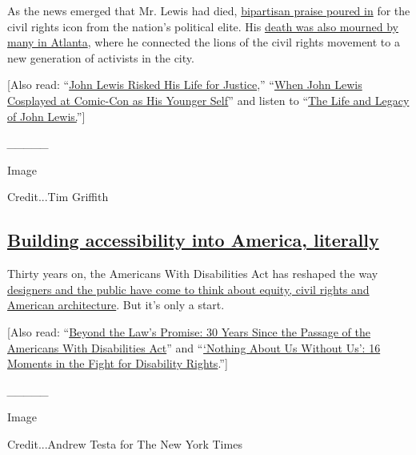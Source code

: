 As the news emerged that Mr. Lewis had died,
\href{https://www.nytimes3xbfgragh.onion/2020/07/18/us/politics/john-lewis-dies-reaction.html}{bipartisan
praise poured in} for the civil rights icon from the nation's political
elite. His
\href{https://www.nytimes3xbfgragh.onion/2020/07/18/us/John-Lewis-Atlanta.html}{death
was also mourned by many in Atlanta}, where he connected the lions of
the civil rights movement to a new generation of activists in the city.

{[}Also read:
``\href{https://www.nytimes3xbfgragh.onion/2020/07/17/opinion/john-lewis.html}{John
Lewis Risked His Life for Justice},''
``\href{https://www.nytimes3xbfgragh.onion/2020/07/21/us/politics/john-lewis-comic-con.html}{When
John Lewis Cosplayed at Comic-Con as His Younger Self}'' and listen to
``\href{https://www.nytimes3xbfgragh.onion/2020/07/20/podcasts/the-daily/john-lewis.html}{The
Life and Legacy of John Lewis.}''{]}

\emph{\_\_\_\_\_}

Image

Credit...Tim Griffith

\hypertarget{building-accessibility-into-america-literally}{%
\subsection{\texorpdfstring{\href{https://www.nytimes3xbfgragh.onion/2020/07/20/arts/disabilities-architecture-design.html}{Building
accessibility into America,
literally}}{Building accessibility into America, literally}}\label{building-accessibility-into-america-literally}}

Thirty years on, the Americans With Disabilities Act has reshaped the
way
\href{https://www.nytimes3xbfgragh.onion/2020/07/20/arts/disabilities-architecture-design.html}{designers
and the public have come to think about equity, civil rights and
American architecture}. But it's only a start.

{[}Also read:
``\href{https://www.nytimes3xbfgragh.onion/interactive/2020/us/disability-ADA-30-anniversary.html}{Beyond
the Law's Promise: 30 Years Since the Passage of the Americans With
Disabilities Act}'' and
``\href{https://www.nytimes3xbfgragh.onion/2020/07/22/us/ada-disabilities-act-history.html}{`Nothing
About Us Without Us': 16 Moments in the Fight for Disability
Rights}.''{]}

\emph{\_\_\_\_\_}

Image

Credit...Andrew Testa for The New York Times


